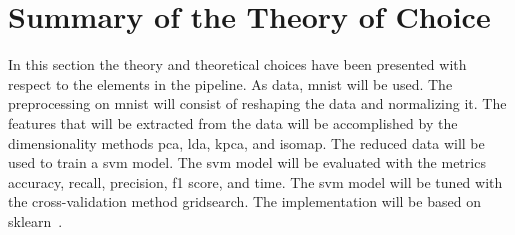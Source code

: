 \section{Summary of the Theory of Choice}\label{sec:theory-choice-summary}
In this section the theory and theoretical choices have been presented with respect to the elements in the pipeline. As data, \gls{mnist} will be used. The preprocessing on \gls{mnist} will consist of reshaping the data and normalizing it. The features that will be extracted from the data will be accomplished by the dimensionality methods \gls{pca}, \gls{lda}, \gls{kpca}, and \gls{isomap}. The reduced data will be used to train a \gls{svm} model. The \gls{svm} model will be evaluated with the metrics accuracy, recall, precision, f1 score, and time. The \gls{svm} model will be tuned with the cross-validation method gridsearch. The implementation will be based on \gls{sklearn}~\cite{scikit-learn}. 